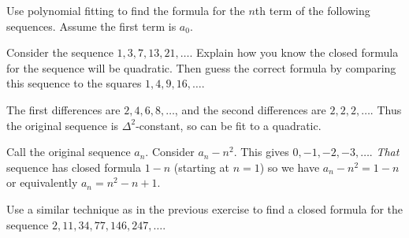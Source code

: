 \begin{questions}



\question Use polynomial fitting to find the formula for the $n$th term of the following sequences.  Assume the first term is $a_0$.

	\begin{answer}
	\end{answer}



\question Consider the sequence $ 1, 3, 7, 13, 21, \ldots$.  Explain how you know the closed formula for the sequence will be quadratic.  Then guess the correct formula by comparing this sequence to the squares $1, 4, 9, 16, \ldots$.

	\begin{answer}
		The first differences are $2, 4, 6, 8, \ldots$, and the second differences are $2, 2, 2, \ldots$.  Thus the original sequence is $\Delta^2$-constant, so can be fit to a quadratic.
		
		Call the original sequence $a_n$.  Consider $a_n - n^2$. This gives $0, -1, -2, -3, \ldots$.  \emph{That} sequence has closed formula $1-n$ (starting at $n = 1$) so we have $a_n - n^2 = 1-n$ or equivalently $a_n = n^2 - n + 1$.
	\end{answer}


\question Use a similar technique as in the previous exercise to find a closed formula for the sequence $2, 11, 34, 77, 146, 247,\ldots$.


\end{questions}

